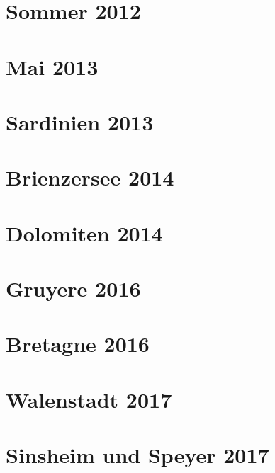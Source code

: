 \documentclass[11pt,nswissgerman]{article}
\begin{document}
\section{Sommer 2012}

\newpage
\section{Mai 2013}

\newpage
\section{Sardinien 2013}

\newpage
\section{Brienzersee 2014}

\newpage
\section{Dolomiten 2014}

\newpage
\section{Gruyere 2016}

\newpage
\section{Bretagne 2016}

\newpage
\section{Walenstadt 2017}

\newpage
\section{Sinsheim und Speyer 2017}

\newpage
\listoffigures
\newpage
\appendix
\end{document}
